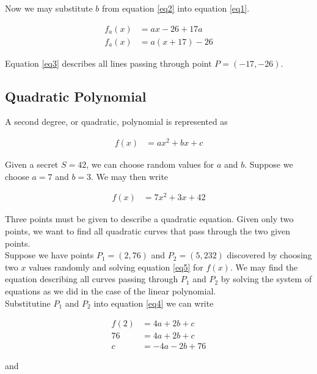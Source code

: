 \documentclass[preview,border=3mm]{article}
\begin{document}
\noindent
Now we may substitute $b$ from equation \ref{eq2} into equation \ref{eq1}.


\begin{align}
    f_a(x) &= ax -26 + 17a \nonumber \\
    f_a(x) &= a(x + 17) - 26 \label{eq3}
\end{align}

\noindent
Equation \ref{eq3} describes all lines passing through point $P = (-17, -26)$.\\


\subsection{Quadratic Polynomial}

\noindent
A second degree, or quadratic, polynomial is represented as

\begin{align}
    f(x) &= ax^2 + bx + c \label{eq4}
\end{align}

\noindent
Given a secret $S = 42$, we can choose random values for $a$ and $b$. Suppose
we choose $a = 7$ and $b = 3$. We may then write

\begin{align}
    f(x) &= 7x^2 + 3x + 42 \label{eq5}
\end{align}

\noindent
Three points must be given to describe a quadratic equation. Given only two
points, we want to find all quadratic curves that pass through the two given
points.\\

\noindent
Suppose we have points $P_1 = (2, 76)$ and $P_2 = (5, 232)$ discovered by choosing
two $x$ values randomly and solving equation \ref{eq5} for $f(x)$. We may find
the equation describing all curves passing through $P_1$ and $P_2$ by solving
the system of equations as we did in the case of the linear polynomial.\\

\noindent
Substitutine $P_1$ and $P_2$ into equation \ref{eq4} we can write

\begin{align}
    f(2) &= 4a + 2b + c \nonumber \\
    76   &= 4a + 2b + c \nonumber \\
    c    &= -4a - 2b + 76 \label{eq6}
\end{align}

\noindent
and
\end{document}
